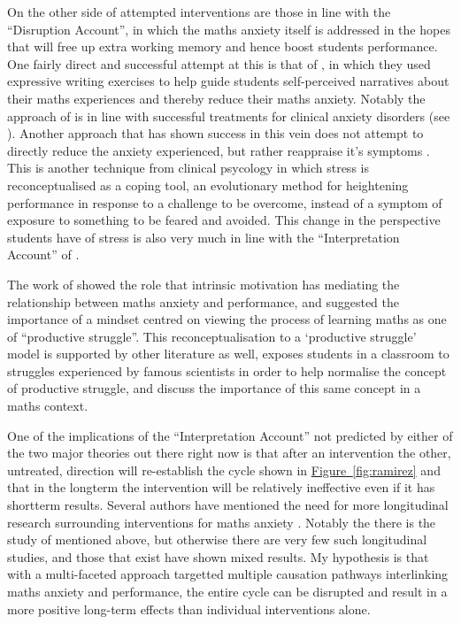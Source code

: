 \documentclass[14pt]{memoir}
\newcommand{\reffig}[1]{\hyperref[fig:#1]{Figure~\ref{fig:#1}}}
\begin{document}
On the other side of attempted interventions are those in line with the ``Disruption Account'', in which the maths anxiety itself is addressed in the hopes that will free up extra working memory and hence boost students performance. One fairly direct and successful attempt at this is that of , in which they used expressive writing exercises to help guide students self-perceived narratives about their maths experiences and thereby reduce their maths anxiety. Notably the approach of  is in line with successful treatments for clinical anxiety disorders (see ). Another approach that has shown success in this vein does not attempt to directly reduce the anxiety experienced, but rather reappraise it's symptoms \cite{Jamieson2016}. This is another technique from clinical psycology in which stress is reconceptualised as a coping tool, an evolutionary method for heightening performance in response to a challenge to be overcome, instead of a symptom of exposure to something to be feared and avoided. This change in the perspective students have of stress is also very much in line with the ``Interpretation Account'' of .

The work of  showed the role that intrinsic motivation has mediating the relationship between maths anxiety and performance, and suggested the importance of a mindset centred on viewing the process of learning maths as one of ``productive struggle''. This reconceptualisation to a `productive struggle' model is supported by other literature as well,  exposes students in a classroom to struggles experienced by famous scientists in order to help normalise the concept of productive struggle, and  discuss the importance of this same concept in a maths context.

One of the implications of the ``Interpretation Account''  not predicted by either of the two major theories out there right now is that after an intervention the other, untreated, direction will re-establish the cycle shown in \reffig{ramirez} and that in the longterm the intervention will be relatively ineffective even if it has shortterm results. Several authors have mentioned the need for more longitudinal research surrounding interventions for maths anxiety \cite{Pellicioni2016,Chang2016}. Notably the there is the study of  mentioned above, but otherwise there are very few such longitudinal studies, and those that exist have shown mixed results. My hypothesis is that with a multi-faceted approach targetted multiple causation pathways interlinking maths anxiety and performance, the entire cycle can be disrupted and result in a more positive long-term effects than individual interventions alone.
\end{document}
